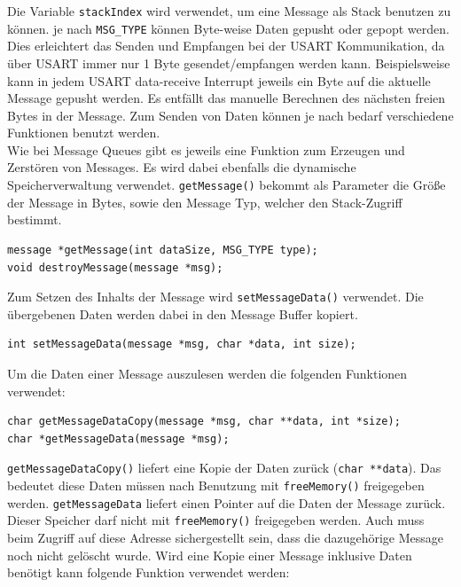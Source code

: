 \documentclass[fontsize=12pt, toc=bibliography, notitlepage]{scrreprt}
\begin{document}
Die Variable \lstinline$stackIndex$ wird verwendet, um eine Message als Stack benutzen zu können. je nach \lstinline$MSG_TYPE$ können Byte-weise Daten gepusht oder gepopt werden. Dies erleichtert das Senden und Empfangen bei der USART Kommunikation, da über USART immer nur 1 Byte gesendet/empfangen werden kann. Beispielsweise kann in jedem USART data-receive Interrupt jeweils ein Byte auf die aktuelle Message gepusht werden. Es entfällt das manuelle Berechnen des nächsten freien Bytes in der Message. Zum Senden von Daten können je nach bedarf verschiedene Funktionen benutzt werden.\\

Wie bei Message Queues gibt es jeweils eine Funktion zum Erzeugen und Zerstören von Messages. Es wird dabei ebenfalls die dynamische Speicherverwaltung verwendet. \lstinline$getMessage()$ bekommt als Parameter die Größe der Message in Bytes, sowie den Message Typ, welcher den Stack-Zugriff bestimmt.

\begin{lstlisting}
message *getMessage(int dataSize, MSG_TYPE type);
void destroyMessage(message *msg);
\end{lstlisting}

Zum Setzen des Inhalts der Message wird \lstinline$setMessageData()$ verwendet. Die übergebenen Daten werden dabei in den Message Buffer kopiert.

\begin{lstlisting}
int setMessageData(message *msg, char *data, int size);
\end{lstlisting}

Um die Daten einer Message auszulesen werden die folgenden Funktionen verwendet:

\begin{lstlisting}
char getMessageDataCopy(message *msg, char **data, int *size);
char *getMessageData(message *msg);
\end{lstlisting}

\newpage

\lstinline$getMessageDataCopy()$ liefert eine Kopie der Daten zurück (\lstinline$char **data$). Das bedeutet diese Daten müssen nach Benutzung mit \lstinline$freeMemory()$  freigegeben werden. \lstinline$getMessageData$ liefert einen Pointer auf die Daten der Message zurück. Dieser Speicher darf nicht mit \lstinline$freeMemory()$  freigegeben werden. Auch muss beim Zugriff auf diese Adresse sichergestellt sein, dass die dazugehörige Message noch nicht gelöscht wurde. Wird eine Kopie einer Message inklusive Daten benötigt kann folgende Funktion verwendet werden:
\end{document}
